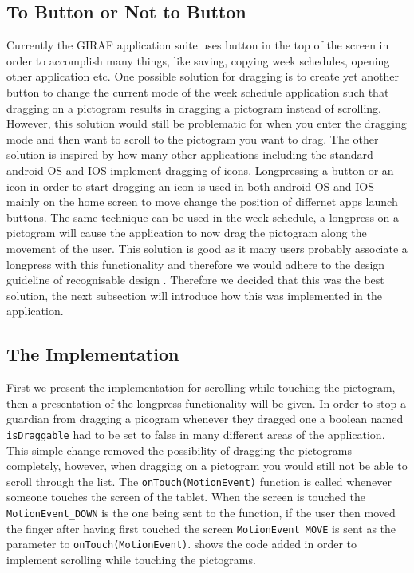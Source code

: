 \subsection*{To Button or Not to Button} %
Currently the GIRAF application suite uses button in the top of the screen in order to accomplish many things, like saving, copying week schedules, opening other application etc. 
One possible solution for dragging is to create yet another button to change the current mode of the week schedule application such that dragging on a pictogram results in dragging a pictogram instead of scrolling.
However, this solution would still be problematic for when you enter the dragging mode and then want to scroll to the pictogram you want to drag.
The other solution is inspired by how many other applications including the standard android OS and IOS implement dragging of icons.
Longpressing a button or an icon in order to start dragging an icon is used in both android OS and IOS mainly on the home screen to move change the position of differnet apps launch buttons.
The same technique can be used in the week schedule, a longpress on a pictogram will cause the application to now drag the pictogram along the movement of the user.
This solution is good as it many users probably associate a longpress with this functionality and therefore we would adhere to the design guideline of recognisable design \cite[p.~51]{DESIGNBOOK}.
Therefore we decided that this was the best solution, the next subsection will introduce how this was implemented in the application.

\subsection*{The Implementation}
First we present the implementation for scrolling while touching the pictogram, then a presentation of the longpress functionality will be given.
In order to stop a guardian from dragging a picogram whenever they dragged one a boolean named \texttt{isDraggable} had to be set to false in many different areas of the application.
This simple change removed the possibility of dragging the pictograms completely, however, when dragging on a pictogram you would still not be able to scroll through the list.
The \texttt{onTouch(MotionEvent)} function is called whenever someone touches the screen of the tablet.
When the screen is touched the \texttt{MotionEvent\_DOWN} is the one being sent to the function, if the user then moved the finger after having first touched the screen \texttt{MotionEvent\_MOVE} is sent as the parameter to \texttt{onTouch(MotionEvent)}.
 shows the code added in order to implement scrolling while touching the pictograms.


